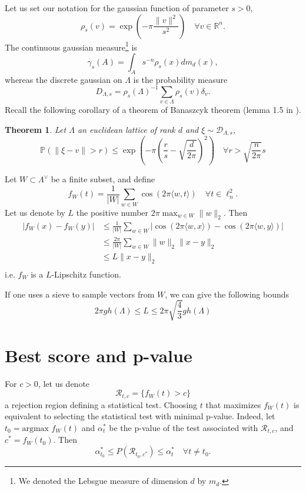 \documentclass{article}
\newtheorem{theorem}{Theorem}
\begin{document}
Let us set our notation for the gaussian function of parameter $s>0$, 
$$\rho_s(v)=\exp(-\pi\frac{\|v\|^2 }{s^2} )\quad \forall v\in \mathbb R^n.$$
The continuous gaussian measure\footnote{We denoted the Lebsgue measure of dimension $d$ by $m_d$.} is 
$$\gamma_s(A) =  \int_A s^{-n}\rho_s(x)dm_d(x) ,$$
whereas the discrete gaussian on $\Lambda$ is the probability measure 
$$D_{\Lambda , s} = \rho_s(\Lambda )^{-1} \sum_{v\in \Lambda} \rho_s(v)\delta_v. $$
Recall the following corollary of a theorem of Banaszcyk theorem (lemma 1.5 in \cite{banaszczyk1993new}).

\begin{theorem}
Let $\Lambda$ an euclidean lattice of rank $d$ and $\xi \sim \mathcal D_{\Lambda , s}$,
$$\mathbb P(\|\xi - v\|> r ) \leq \exp(-\pi (\frac{r}{s} -\sqrt{\frac{d}{2\pi}})^2) \quad \forall r >\sqrt{\frac{n}{2\pi}}s $$
\end{theorem}

Let $W\subset \Lambda^\vee$ be a finite subset, and define 
$$f_W(t) = \frac{1}{|W|}\sum_{w\in W} \cos(2\pi \langle w , t \rangle) \quad \forall t \in \ell^2_n.$$
Let us denote by $L$ the positive number $2\pi\max_{w\in W} \|w\|_2$. Then
\[\begin{split}
|f_W(x) -f_W(y)| & \leq \frac{1}{|W|}\sum_{w\in W} |\cos(2\pi \langle w , x \rangle ) -\cos(2\pi \langle w , y \rangle) | \\
		 & \leq \frac{2\pi}{|W|}\sum_{w\in W} \|w\|_2 \|x-y\|_2\\
		 & \leq L\|x-y\|_2\\ 
\end{split}\]
i.e. $f_W$ is a $L$-Lipschitz function.  

If one uses a sieve to sample vectors from $W$, we can give the following bounds 
$$2\pi gh(\Lambda) \leq L \leq 2\pi\sqrt{\frac{4}{3}}gh(\Lambda) $$

\section{Best score and p-value}

For $c >0 $, let us denote 
$$\mathcal R_{t,c} = \{f_W(t) > c\}$$
a rejection region defining a statistical test. Choosing $t$ that maximizes $f_W(t)$ is equivalent to selecting the statistical test with minimal p-value. Indeed, let $t_0 = \text{argmax }f_W(t)$ and $\alpha^*_t$ be the p-value of the test associated with $\mathcal R_{t,c}$, and $c^* = f_W(t_0)$. Then 
$$\alpha^*_{t_0} \leq  P(\mathcal R_{t_0,c^*} ) \leq \alpha^*_t \quad \forall t\neq t_0.$$
\end{document}
